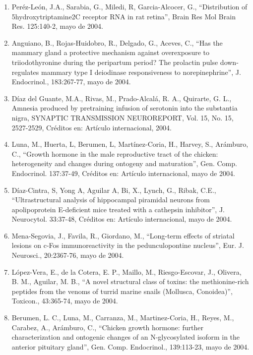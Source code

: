 \begin{enumerate}
\item Peréz-León, J.A., Sarabia, G., Miledi, R, Garcia-Alcocer, G., “Distribution of 5hydroxytriptamine2C receptor RNA in rat 
retina”, Brain Res Mol Brain Res. 125:140-2,    mayo de 2004.

\item Anguiano, B., Rojas-Huidobro, R., Delgado, G., Aceves, C., “Has the mammary gland a protective mechanism against 
overexposure to triiodothyronine during the peripartum period? The prolactin pulse down-regulates mammary type I deiodinase 
responsiveness to norepinephrine”, J. Endocrinol., 183:267-77,    mayo de 2004.

\item Díaz del Guante, M.A., Rivas, M., Prado-Alcalá, R. A., Quirarte, G. L., Amnesia produced by pretraining infusion of 
serotonin into the substantia nigra, SYNAPTIC TRANSMISSION NEUROREPORT, Vol. 15, No. 15, 2527-2529, Créditos en: Artículo 
internacional, 2004.

\item Luna, M., Huerta, L, Berumen, L, Martínez-Coria, H., Harvey, S., Arámburo, C., “Growth hormone in the male reproductive 
tract of the chicken: heterogeneity and changes during ontogeny and maturation”, Gen. Comp. Endocrinol. 137:37-49, Créditos 
en: Artículo internacional, mayo de 2004.

\item Díaz-Cintra, S, Yong A, Aguilar A, Bi, X., Lynch, G., Ribak, C.E., “Ultrastructural analysis of hippocampal piramidal 
neurons from apolipoprotein E-deficient mice treated with a cathepsin inhibitor”, J. Neurocytol. 33:37-48, Créditos en: 
Artículo internacional, mayo de 2004.

\item Mena-Segovia, J., Favila, R., Giordano, M., “Long-term effects of striatal lesions on c-Fos immunoreactivity in the 
pedunculopontine nucleus”, Eur. J. Neurosci., 20:2367-76,    mayo de 2004.

\item López-Vera, E., de la Cotera, E. P., Maillo, M., Riesgo-Escovar, J., Olivera, B. M., Aguilar, M. B., “A novel 
structural 
class of toxins: the methionine-rich peptides from the venoms of turrid marine snails (Mollusca, Conoidea)”, Toxicon., 
43:365-74,    mayo de 2004.

\item Berumen, L. C., Luna, M., Carranza, M., Martinez-Coria, H., Reyes, M., Carabez, A., Arámburo, C., “Chicken growth 
hormone: further characterization and ontogenic changes of an N-glycosylated isoform in the anterior pituitary gland”, Gen. 
Comp. Endocrinol., 139:113-23,    mayo de 2004.


\end{enumerate}
